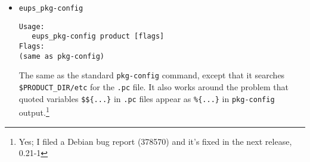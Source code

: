 \documentclass{article}
\newcommand{\code}[1]{\texttt{#1}}
\newcommand{\eups}{\code{ExtUPS}}
\newcommand{\pacman}{\code{pacman}}
\begin{document}
\begin{itemize}
When creating an distribution, tarballs that already present are not recreated
(unless you specify \code{--force}),
so repeating a \code{eups\_distrib --create} command to create a manifest for another
product won't lead to duplication of tarballs.  If you want to use \pacman{},
see App. \ref{pacman}.

When unpacking a distribution with \code{eups\_distrib --extract}, products that are
already declared to \eups{} won't be unpacked and re-declared (unless you specify \code{--force}).

If you don't specify a version when installing a distribution with
\code{--extract} the current version will be used.  This isn't quite the same
as the version declared current on some machine where the distribution
originated, as a bleeding-edge version acceptable in Princeton may not
be ready for deployment on a mountain top in e.g. Chile. In
consequence, the list of `current' versions is \textit{not}
automatically created or updated by \code{eups\_distrib --create}, but is
only set when you later say \code{eups\_distrib --current}.  If you don't specify
a product, the list will in fact be identical to your local preferences.
Alternatively, you can update a single product's version number (e.g.
\code{eups\_distrib --current moby}) or specify a version (\code{eups\_distrib --current moby v1\_2}).

\textit{N.b.} As presently written, \code{eups\_distrib} assumes that you've
installed all the products into \eups, as opposed to simple declaring them, but
relying on files installed in e.g. \code{/usr/local}; more precisely, it assumes
that all product directories start with a directory listed in \code{EUPS\_PATH}.
This is probably a good idea, as otherwise \code{eups\_distrib} would tar up
all of /usr/local for you.


\item \code{eups\_pkg-config}
\begin{verbatim}
Usage:
   eups_pkg-config product [flags]
Flags:
(same as pkg-config)
\end{verbatim}

The same as the standard \code{pkg-config} command, except that it
searches \code{\$PRODUCT\_DIR/etc} for the \code{.pc} file.  It also
works around the problem that quoted variables \code{\$\$\{...\}}
in \code{.pc} files appear as \code{\%\{...\}} in \code{pkg-config} output.\footnote{
  Yes; I filed a Debian bug report (378570) and it's fixed in the next release, 0.21-1}
  

\end{itemize}
\end{document}
